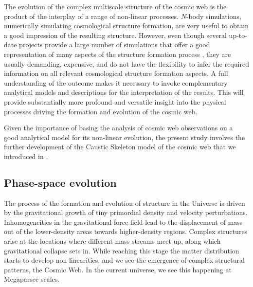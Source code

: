 \documentclass[a4paper, 11pt]{article}
\begin{document}
The evolution of the complex multiscale structure of the cosmic web is the product of the interplay of a range of non-linear processes. $N$-body simulations, numerically simulating cosmological structure formation, are very useful to obtain a good impression of the resulting structure. However, even though several up-to-date projects provide a large number of simulations that offer a good representation of many aspects of the structure formation process \cite{ABACUSSUMMIT:2021, Quijote:2020}, they are usually demanding, expensive, and do not have the flexibility to infer the required information on all relevant cosmological structure formation aspects. A full understanding of the outcome makes it necessary to invoke complementary analytical models and descriptions for the interpretation of the results. This will provide substantially more profound and versatile insight into the physical processes driving the formation and evolution of the cosmic web.

Given the importance of basing the analysis of cosmic web observations on a good analytical model for its non-linear evolution, the present study involves the further development of the Caustic Skeleton model of the cosmic web that we introduced in \cite{Feldbrugge:2018}. 

\subsection{Phase-space evolution}
The process of the formation and evolution of structure in the Universe is driven by the gravitational growth of tiny primordial density and velocity perturbations. Inhomogeneities in the gravitational force field lead to the displacement of mass out of the lower-density areas towards higher-density regions. Complex structures arise at the locations where different mass streams meet up, along which gravitational collapse sets in. While reaching this stage the matter distribution starts to develop non-linearities, and we see the emergence of complex structural patterns, the Cosmic Web.  In the current universe, we see this happening at Megaparsec scales. 
\end{document}
